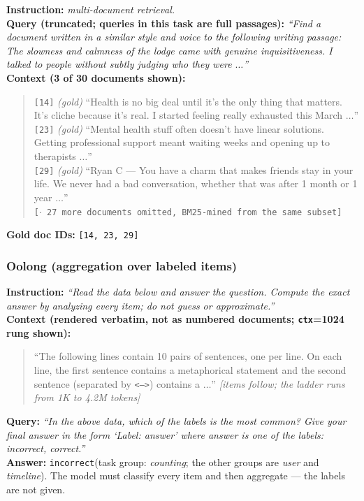 \textbf{Instruction:} \emph{multi-document retrieval.}\\
\textbf{Query (truncated; queries in this task are full passages):} \emph{``Find a document written
in a similar style and voice to the following writing passage: The slowness and calmness of the
lodge came with genuine inquisitiveness. I talked to people without subtly judging who they were
$\dots$''}\\
\textbf{Context (3 of 30 documents shown):}
\begin{quote}\small
\texttt{[14]} \emph{(gold)} ``Health is no big deal until it's the only thing that matters. It's
cliche because it's real. I started feeling really exhausted this March $\dots$''\\
\texttt{[23]} \emph{(gold)} ``Mental health stuff often doesn't have linear solutions. Getting
professional support meant waiting weeks and opening up to therapists $\dots$''\\
\texttt{[29]} \emph{(gold)} ``Ryan C --- You have a charm that makes friends stay in your life. We
never had a bad conversation, whether that was after 1 month or 1 year $\dots$''\\
\texttt{[$\cdot$ 27 more documents omitted, BM25-mined from the same subset]}
\end{quote}
\textbf{Gold doc IDs:} \texttt{[14, 23, 29]}

\subsubsection{Oolong (aggregation over labeled items)}

\textbf{Instruction:} \emph{``Read the data below and answer the question. Compute the exact answer by
analyzing every item; do not guess or approximate.''}\\
\textbf{Context (rendered verbatim, not as numbered documents; \texttt{ctx}=1024 rung shown):}
\begin{quote}\small
``The following lines contain 10 pairs of sentences, one per line. On each line, the first sentence
contains a metaphorical statement and the second sentence (separated by \texttt{<-->}) contains a
$\dots$'' \emph{[items follow; the ladder runs from 1K to 4.2M tokens]}
\end{quote}
\textbf{Query:} \emph{``In the above data, which of the labels is the most common? Give your final
answer in the form `Label: answer' where answer is one of the labels: incorrect, correct.''}\\
\textbf{Answer:} \texttt{incorrect}\quad(task group: \emph{counting}; the other groups are
\emph{user} and \emph{timeline}). The model must classify every item and then aggregate --- the
labels are not given.

